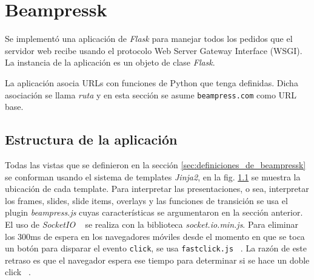 	\section{Beampressk} %
	\label{sec:beampressk_imp}
		Se implementó una aplicación de \textit{Flask} para manejar todos los pedidos que el servidor web recibe usando el protocolo Web Server Gateway Interface (WSGI). La instancia de la aplicación es un objeto de clase \textit{Flask}.

		La aplicación asocia URLs con funciones de Python que tenga definidas. Dicha asociación se llama \textit{ruta} y en esta sección se asume \texttt{beampress.com} como URL base.
		
		\subsection{Estructura de la aplicación} %
		\label{sub:estructura_de_la_aplicacion}
			Todas las vistas que se definieron en la sección \ref{sec:definiciones_de_beampressk} se conforman usando el sistema de templates \textit{Jinja2}, en la fig. \ref{sub:estructura_de_la_aplicacion} se muestra la ubicación de cada template.
			Para interpretar las presentaciones, o sea, interpretar los frames, slides, slide items, overlays y las funciones de transición se usa el plugin \textit{beampress.js} cuyas características se argumentaron en la sección anterior. El uso de \textit{SocketIO} ~\cite{socketio} se realiza con la biblioteca \textit{socket.io.min.js}. Para eliminar los 300ms de espera en los navegadores móviles desde el momento en que se toca un botón para disparar el evento \texttt{click}, se usa \texttt{fastclick.js} ~\cite{fastclick}. La razón de este retraso es que el navegador espera ese tiempo para determinar si se hace un doble click ~\cite{fior}.
